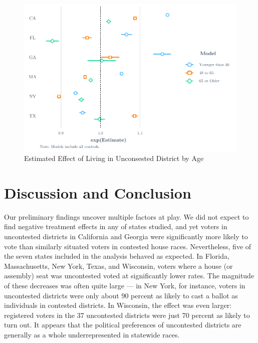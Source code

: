 \documentclass[
  12pt,
]{article}
\begin{document}
\begin{figure}[H]

{\centering \includegraphics{write_files/figure-latex/age-plots-1} 

}

\caption{\label{fig:ages}Estimated Effect of Living in Unconsested District by Age}\label{fig:age-plots}
\end{figure}

\hypertarget{discussion-and-conclusion}{%
\section*{Discussion and Conclusion}\label{discussion-and-conclusion}}

Our preliminary findings uncover multiple factors at play. We did not expect to find negative treatment effects in any of states studied, and yet voters in uncontested districts in California and Georgia were significantly more likely to vote than similarly situated voters in contested house races. Nevertheless, five of the seven states included in the analysis behaved as expected. In Florida, Massachusetts, New York, Texas, and Wisconsin, voters where a house (or assembly) seat was uncontested voted at significantly lower rates. The magnitude of these decreases was often quite large --- in New York, for instance, voters in uncontested districts were only about 90 percent as likely to cast a ballot as individuals in contested districts. In Wisconsin, the effect was even larger: registered voters in the 37 uncontested districts were just 70 percent as likely to turn out. It appears that the political preferences of uncontested districts are generally as a whole underrepresented in statewide races.
\end{document}
